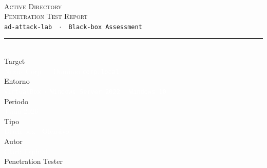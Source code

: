 \documentclass[11pt,a4paper]{article}
\begin{document}
\raggedbottom
{}

\begin{titlepage}
\pagecolor{darkbg}
\color{white}


\vspace*{2cm}
\begin{center}

{\small{}}\\[1.2cm]

{\fontsize{28}{34}\selectfont\textsc{Active Directory}}\\[0.3cm]
{\fontsize{28}{34}\selectfont\textsc{\textcolor{accentblue}{Penetration Test Report}}}\\[1.8cm]

{\small\textcolor{textlight}{\texttt{ad-attack-lab \ $\cdot$ \ Black-box Assessment}}}\\[2.5cm]

{\color{accentblue!40}\rule{6cm}{0.4pt}}\\[2cm]

{\small\textcolor{textmuted}{Target}}\\[0.2cm]
{\normalsize\textcolor{white}{Nexus Corp --- Dominio \texttt{corp.local}}}\\[0.5cm]
{\small\textcolor{textmuted}{Entorno}}\\[0.2cm]
{\normalsize\textcolor{white}{\texttt{VirtualBox $\cdot$ Windows Server 2022 $\cdot$ Windows 10}}}\\[0.5cm]
{\small\textcolor{textmuted}{Periodo}}\\[0.2cm]
{\normalsize\textcolor{white}{Junio 2026}}\\[0.5cm]
{\small\textcolor{textmuted}{Tipo}}\\[0.2cm]
{\normalsize\textcolor{white}{Black-box $\cdot$ Ofensivo}}\\[2cm]

{\small\textcolor{textmuted}{Autor}}\\[0.3cm]
{\normalsize\textcolor{white}{Clark Espinal}}\\[0.1cm]
{\small\textcolor{textlight}{Penetration Tester}}

\end{center}
\end{titlepage}
\end{document}
